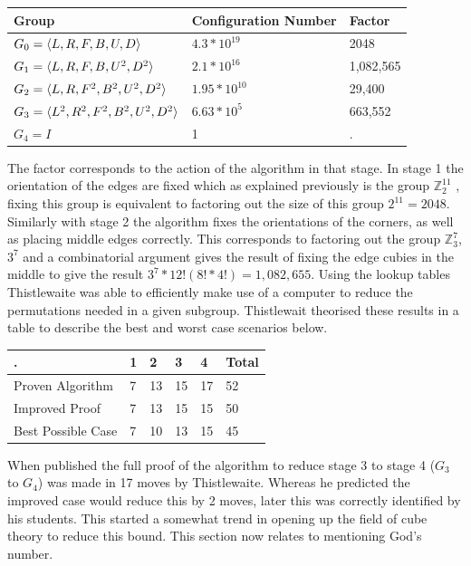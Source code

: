 \documentclass{article}
\DeclarePairedDelimiter{\opair}{\langle}{\rangle}
\begin{document}
\begin{center}
\label{:thistletab}
    \begin{tabular}{ | p{6cm} | p{4cm}| p{3cm} |}
    \hline
    Group & Configuration Number & Factor \\ \hline
    $G_{0} = \opair{L,R,F,B,U,D}$ & $4.3*10^{19}$ & 2048\\ \hline
    $G_{1} = \opair{L,R,F,B,U^{2},D^{2}}$ &  $2.1*10^{16}$ & 1,082,565\\ \hline
    $G_{2} = \opair{L,R,F^{2},B^{2},U^{2},D^{2}}$& $1.95*10^{10}$ & 29,400 \\ \hline
    $G_{3} = \opair{L^{2},R^{2},F^{2},B^{2},U^{2},D^{2}}$& $6.63*10^{5}$ & 663,552\\ \hline
    $G_{4} = I$& 1 & .\\ \hline
    \end{tabular}
\end{center}
The factor corresponds to the action of the algorithm in that stage. In stage 1 the orientation of the edges are fixed which as explained previously is the group $\mathbb{Z}_{2}^{11}$ , fixing this group is equivalent to factoring out the size of this group $2^{11} = 2048$. Similarly with stage 2 the algorithm fixes the orientations of the corners, as well as placing middle edges correctly. This corresponds to factoring out the group $\mathbb{Z}_{3}^{7}$, $3^7$  and a combinatorial argument gives the result of fixing the edge cubies in the middle to give the result $3^7 * 12!(8!*4!) = 1,082,655$. Using the lookup tables Thistlewaite was able to efficiently make use of a computer to reduce the permutations needed in a given subgroup. Thistlewait theorised these results in a table to describe the best and worst case scenarios below.
\begin{center}
\label{:thistletab}
    \begin{tabular}{ | p{4cm}| p{1.5cm}| p{1.5cm}| p{1.5cm}| p{1.5cm}| p{2cm}|}
    \hline
    . & 1 & 2 & 3 & 4 & Total \\ \hline
    Proven Algorithm & 7 & 13 & 15 & 17 & 52\\ \hline
	Improved Proof & 7 & 13 &15 & 15 & 50\\ \hline
	Best Possible Case & 7 & 10 & 13 & 15 &45\\ \hline
    \end{tabular}
\end{center}
When published the full proof of the algorithm to reduce stage 3 to stage 4 ($G_3$ to $G_4$) was made in 17 moves by Thistlewaite. Whereas he predicted the improved case would reduce this by 2 moves, later this was correctly identified by his students. This started a somewhat trend in opening up the field of cube theory to reduce this bound. This section now relates to mentioning God's number.
\end{document}
